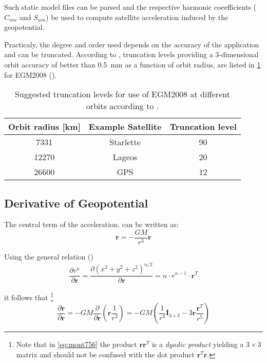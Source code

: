Such static model files can be parsed and the respective harmonic coeefficients 
(\(C_{nm}\) and \(S_{nm}\)) be used to compute satellite acceleration induced by 
the geopotential.

Practicaly, the degree and order used depends on the accuracy of the 
application and can be truncated. According to \cite{iers2010}, truncation levels 
providing a 3-dimensional orbit accuracy of better than \SI{0.5}{\mm} as a 
function of orbit radius, are listed in \ref{table:egm2008-truncation-levels} 
for EGM2008 (\cite{pavlisegm08}).

\begin{table}
\centering
\begin{tabular}{c c c}
 \hline
 Orbit radius [km] & Example Satellite & Truncation level \\
 \hline
  7331  & Starlette & 90 \\
  12270 & Lageos    & 20 \\
  26600 & GPS       & 12 \\
 \hline
\end{tabular}
\caption{Suggested truncation levels for use of EGM2008 at different orbits according to \cite{iers2010}.}
\label{table:egm2008-truncation-levels}
\end{table}

\subsection{Derivative of Geopotential}
\label{ssec:derivative-of-geopotential}
The central term of the acceleration, can be written as:
\begin{equation}
  \label{eq:mont754}
  \ddot{\bm{r}} = - \frac{GM}{r^3} \bm{r}
\end{equation}

Using the general relation (\cite{Montenbruck2000}) 
\begin{equation}
  \label{eq:mont755}
  \frac{\partial r^n}{\partial \bm{r}} = 
    \frac{\partial \left( x^2 + y^2 + z^2 \right) ^{n/2}}{\partial \bm{r}} = 
    n \cdot r^{n-1} \cdot \bm{r}^T
\end{equation}

it follows that \footnote{Note that in \ref{eq:mont756} the product $\bm{r} \bm{r}^T$ is 
a \emph{dyadic product} yielding a $3\times 3$ matrix and should not be confused 
with the dot product $\bm{r}^T \bm{r}$.}
\begin{equation}
  \label{eq:mont756}
  \frac{\partial \ddot{\bm{r}}}{\partial \bm{r}} = 
  -GM \frac{\partial}{\partial \bm{r}} \left( \bm{r} \frac{1}{r^3} \right) =
  -GM \left( \frac{1}{r^3} \bm{I}_{3 \times 3} -3 \bm{r} \frac{\bm{r}^T}{r^5} \right)
\end{equation}

